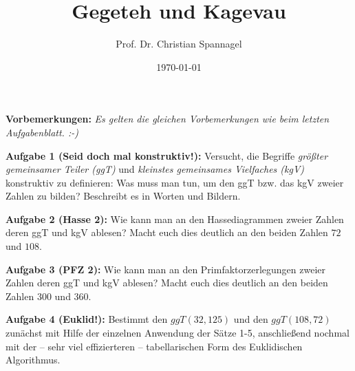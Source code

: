 \documentclass{../cssheet}
\title{Gegeteh und Kagevau}
\author{Prof. Dr. Christian Spannagel}
\date{\today}
\begin{document}
\printtitle 

\vspace*{10mm}

\textbf{Vorbemerkungen:} 
\emph{Es gelten die gleichen Vorbemerkungen wie beim letzten Aufgabenblatt. :-)}

\textbf{Aufgabe 1 (Seid doch mal konstruktiv!):}  Versucht, die Begriffe \emph{größter gemeinsamer Teiler (ggT)} und \emph{kleinstes gemeinsames Vielfaches (kgV)} konstruktiv zu definieren: Was muss man tun, um den ggT bzw. das kgV zweier Zahlen zu bilden? Beschreibt es in Worten und Bildern. 

\textbf{Aufgabe 2 (Hasse 2):} Wie kann man an den Hassediagrammen zweier Zahlen deren ggT und kgV ablesen? Macht euch dies deutlich an den beiden Zahlen $72$ und $108$.

\textbf{Aufgabe 3 (PFZ 2):}  Wie kann man an den Primfaktorzerlegungen zweier Zahlen deren ggT und kgV ablesen? Macht euch dies deutlich an den beiden Zahlen $300$ und $360$.
 
\textbf{Aufgabe 4 (Euklid!):}  
Bestimmt den $ggT(32,125)$ und den $ggT(108,72)$ zunächst mit Hilfe der einzelnen Anwendung der Sätze 1-5, anschließend nochmal mit der -- sehr viel effizierteren -- tabellarischen Form des Euklidischen Algorithmus. 

\vspace*{10mm}
\printlicense

\printsocials
\end{document}
